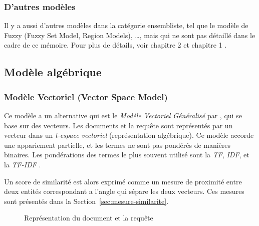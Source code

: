 \subsubsection{D'autres modèles}
Il y a aussi d'autres modèles dans la catégorie ensembliste, tel que le modèle de Fuzzy (Fuzzy Set Model, Region Models), \dots, mais qui ne sont pas détaillé dans le cadre de ce mémoire. Pour plus de détails, voir chapitre 2 \citep{modern-ir} et chapitre 1 \citep{model-ir}.

\subsection{Modèle algébrique}
\subsubsection{Modèle Vectoriel (Vector Space Model)}\label{sec:vsm-model}
Ce modèle a un alternative qui est le \emph{Modèle Vectoriel Généralisé} par \citeauthor{salton1975vector} \citep{salton1975vector}, qui se base sur des vecteurs. Les documents et la requête sont représentés par un vecteur dans un \emph{t-espace vectoriel} (représentation algébrique). Ce modèle accorde une appariement partielle, et les termes ne sont pas pondérés de manières binaires. Les pondérations des termes le plus souvent utilisé sont la \emph{TF}, \emph{IDF}, et la \emph{TF-IDF} \citep*{sarch-engine-vsm}.

Un score de similarité est alors exprimé comme un mesure de proximité entre deux entités correspondant a l'angle qui sépare les deux vecteurs. Ces mesures sont présentés dans la Section~\ref{sec:mesure-similarite}.

\begin{figure}[htbp]
    \begin{center}
    \end{center}
    \caption{Représentation du document et la requête \citep{model-ir}}\label{fig:vector-model}
\end{figure}

